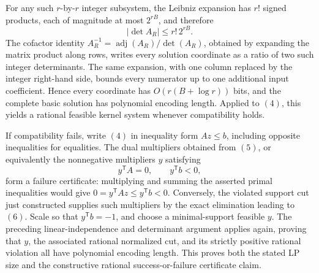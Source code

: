 For any such \(r\)-by-\(r\) integer subsystem, the Leibniz expansion has \(r!\) signed products, each of magnitude at most \(2^{rB}\), and therefore
\[
 |\det A_R|\le r!\,2^{rB}.
\]
The cofactor identity \(A_R^{-1}=\operatorname{adj}(A_R)/\det(A_R)\), obtained by expanding the matrix product along rows, writes every solution coordinate as a ratio of two such integer determinants.  The same expansion, with one column replaced by the integer right-hand side, bounds every numerator up to one additional input coefficient.  Hence every coordinate has
\(O(r(B+\log r))\) bits, and the complete basic solution has polynomial encoding length.  Applied to \((4)\), this yields a rational feasible kernel system whenever compatibility holds.

If compatibility fails, write \((4)\) in inequality form \(Az\le b\), including opposite inequalities for equalities.  The dual multipliers obtained from \((5)\), or equivalently the nonnegative multipliers \(y\) satisfying
\[
 y^{\mathsf T}A=0,\qquad y^{\mathsf T}b<0,
\]
form a failure certificate: multiplying and summing the asserted primal inequalities would give
\(0=y^{\mathsf T}Az\le y^{\mathsf T}b<0\).  Conversely, the violated support cut just constructed supplies such multipliers by the exact elimination leading to \((6)\).  Scale so that \(y^{\mathsf T}b=-1\), and choose a minimal-support feasible \(y\).  The preceding linear-independence and determinant argument applies again, proving that \(y\), the associated rational normalized cut, and its strictly positive rational violation all have polynomial encoding length.  This proves both the stated LP size and the constructive rational success-or-failure certificate claim.
